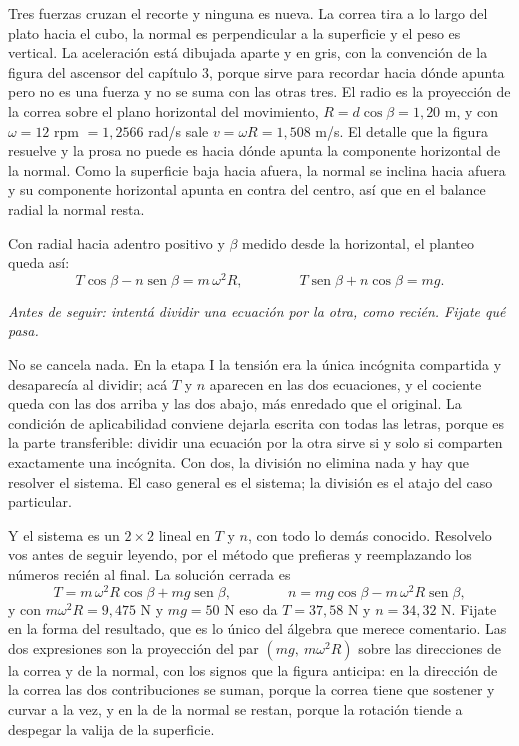 \documentclass[11pt,openany]{book}
\newcommand{\sen}{\operatorname{sen}}
\begin{document}
\begin{ejemplo}[completo]
Tres fuerzas cruzan el recorte y ninguna es nueva. La correa tira a lo largo del plato hacia el cubo, la normal es perpendicular a la superficie y el peso es vertical. La aceleración está dibujada aparte y en gris, con la convención de la figura del ascensor del capítulo 3, porque sirve para recordar hacia dónde apunta pero no es una fuerza y no se suma con las otras tres. El radio es la proyección de la correa sobre el plano horizontal del movimiento, $R = d\cos\beta = 1{,}20$ m, y con $\omega = 12$ rpm $= 1{,}2566$ rad/s sale $v = \omega R = 1{,}508$ m/s. El detalle que la figura resuelve y la prosa no puede es hacia dónde apunta la componente horizontal de la normal. Como la superficie baja hacia afuera, la normal se inclina hacia afuera y su componente horizontal apunta en contra del centro, así que en el balance radial la normal resta.

Con radial hacia adentro positivo y $\beta$ medido desde la horizontal, el planteo queda así:
\[
T\cos\beta - n\sen\beta = m\,\omega^2 R ,
\qquad\qquad
T\sen\beta + n\cos\beta = m g .
\]

\textit{Antes de seguir: intentá dividir una ecuación por la otra, como recién. Fijate qué pasa.}

No se cancela nada. En la etapa I la tensión era la única incógnita compartida y desaparecía al dividir; acá $T$ y $n$ aparecen en las dos ecuaciones, y el cociente queda con las dos arriba y las dos abajo, más enredado que el original. La condición de aplicabilidad conviene dejarla escrita con todas las letras, porque es la parte transferible: dividir una ecuación por la otra sirve si y solo si comparten exactamente una incógnita. Con dos, la división no elimina nada y hay que resolver el sistema. El caso general es el sistema; la división es el atajo del caso particular.

Y el sistema es un $2\times 2$ lineal en $T$ y $n$, con todo lo demás conocido. Resolvelo vos antes de seguir leyendo, por el método que prefieras y reemplazando los números recién al final. La solución cerrada es
\[
T = m\,\omega^2 R\cos\beta + m g\sen\beta ,
\qquad\qquad
n = m g\cos\beta - m\,\omega^2 R\sen\beta ,
\]
y con $m\omega^2 R = 9{,}475$ N y $mg = 50$ N eso da $T = 37{,}58$ N y $n = 34{,}32$ N. Fijate en la forma del resultado, que es lo único del álgebra que merece comentario. Las dos expresiones son la proyección del par $(mg,\ m\omega^2 R)$ sobre las direcciones de la correa y de la normal, con los signos que la figura anticipa: en la dirección de la correa las dos contribuciones se suman, porque la correa tiene que sostener y curvar a la vez, y en la de la normal se restan, porque la rotación tiende a despegar la valija de la superficie.


\end{ejemplo}
\end{document}
